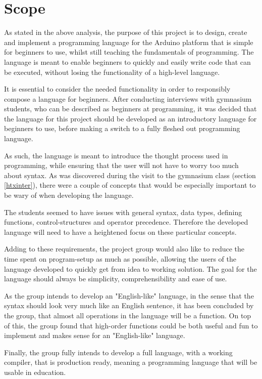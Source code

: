 \section{Scope}
As stated in the above analysis, the purpose of this project is to design, create and implement a programming language for the Arduino platform that is simple for beginners to use, whilst still teaching the fundamentals of programming.
The language is meant to enable beginners to quickly and easily write
code that can be executed, without losing the functionality of a high-level language.

It is essential to consider the needed functionality in order to responsibly compose a language for beginners.
After conducting interviews with gymnasium students, who can be described as beginners at programming, it was decided that the language for this project should be developed as an introductory language for beginners to use, before making a switch to a fully fleshed out programming language.

As such, the language is meant to introduce the thought process used in programming, while ensuring that the user will not have to worry too much about syntax.
As was discovered during the visit to the gymnasium class (section \ref{htxinter}), there were a couple of concepts that would be especially important to be wary of when developing the language.

The students seemed to have issues with general syntax, data types, defining functions, control-structures and operator precedence.
Therefore the developed language will need to have a heightened focus on these particular concepts. 

Adding to these requirements, the project group would also like to reduce the time spent on program-setup as much as possible, allowing the users of the language developed to quickly get from idea to working solution.
The goal for the language should always be simplicity, comprehensibility and ease of use.

As the group intends to develop an "English-like" language, in the sense that the syntax should look very much like an English sentence, it has been concluded by the group, that almost all operations in the language will be a function. 
On top of this, the group found that high-order functions could be both useful and fun to implement and makes sense for an "English-like" language. 

Finally, the group fully intends to develop a full language, with a working compiler, that is production ready, meaning a programming language that will be usable in education.

 
